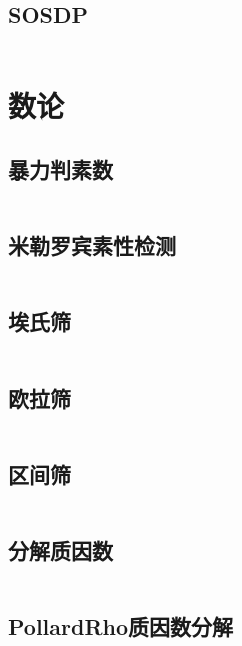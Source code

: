 \inputminted{cpp}{code/数位DP.cc}

\subsection{SOSDP} 

\inputminted{cpp}{code/SOSDP.cc}

\newpage\section{数论} 
\subsection{暴力判素数} 

\inputminted{cpp}{code/bfisprime.cc}

\subsection{米勒罗宾素性检测} 

\inputminted{cpp}{code/Miller_Rabin.cc}

\subsection{埃氏筛} 

\inputminted{cpp}{code/Eratosthenes.cc}

\subsection{欧拉筛} 

\inputminted{cpp}{code/eulerSieve.cc}

\subsection{	区间筛} 

\inputminted{cpp}{code/区间筛.cc}

\subsection{分解质因数} 

\inputminted{cpp}{code/factorization.cc}

\subsection{PollardRho质因数分解} 

